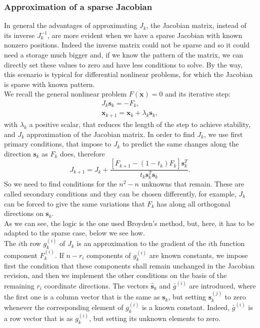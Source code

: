  \subsubsection{Approximation of a sparse Jacobian}
 In general the advantages of approximating $ J_k $, the Jacobian matrix, instead of its inverse $ J_k^{-1} $, are more evident when we have a sparse Jacobian with known nonzero positions. Indeed the inverse matrix could not be sparse and so it could need a storage much bigger and, if we know the pattern of the matrix, we can directly set these values to zero and have less conditions to solve. By the way, this scenario is typical for differential nonlinear problems, for which the Jacobian is sparse with known pattern. \\
  We recall the general nonlinear problem $ F(\textbf{x}) = 0 $ and its iterative step:
 \begin{eqnarray*}
 J_k \textbf{s}_k = - F_k, \\
\textbf{x}_{k+1} = \textbf{x}_k + \lambda_k \textbf{s}_k,
 \end{eqnarray*}
 with $ \lambda_k $ a positive scalar, that reduces the length of the step to achieve stability, and $ J_k  $ approximation of the Jacobian matrix. 
 In order to find $ J_k $, we use first primary conditions, that impose to $ J_k $ to predict the same changes along the direction $ \textbf{s}_k $ as $ F_k $ does, therefore 
 \begin{equation}
 \label{prim}
 J_{k+1} = J_k + \frac{ [ F_{k+1} - (1-t_k) F_k ] \textbf{s}_k^T}{t_k \textbf{s}_k^T \textbf{s}_k}.
 \end{equation}
 So we need to find conditions for the $ n^2 -n $ unknowns that remain. These are called secondary conditions and they can be chosen differently, for example, $ J_k $ can be forced to give the same variations that $ F_k $ has along all orthogonal directions on $ \textbf{s}_k $.\\
  As we can see, the logic is the one used Broyden's method, but, here, it has to be adapted to the sparse case, below we see how.\\
  The $ i $th row $ g_k^{(i)} $ of $ J_k $ is an approximation to the gradient of the $ i $th function component $ F_k^{(i)} $. If $ n-r_i $ components of $g_k^{(i)} $ are known constants, we impose first the condition that these components shall remain unchanged in the Jacobian revision, and then we implement the other conditions on the basis of the remaining $ r_i $ coordinate directions.
  The vectors $ \hat{\textbf{s}}_k $ and $ \bar{g}^{(i)} $ are introduced, where the first one is a column vector that is the same as $ \textbf{s}_k $, but setting  $\textbf{s}_k^{(j)} $ to zero whenever the corresponding element of $ g_k^{(i)} $ is a known constant. Indeed, $ \bar{g}^{(i)} $ is a row vector that is as $ g_k^{(i)} $, but setting its unknown elements to zero. 
